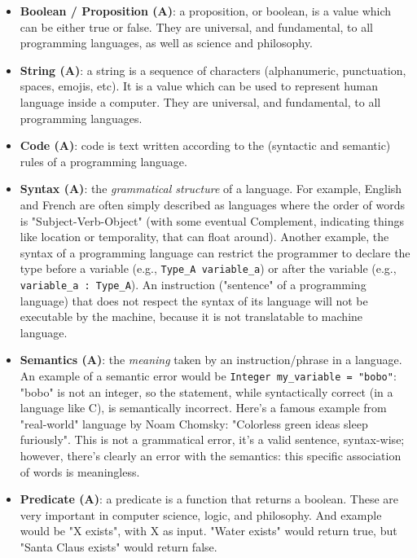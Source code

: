 \documentclass{article}
\begin{document}
\begin{itemize}
	\item \textbf{Boolean / Proposition (A)}: a proposition, or boolean, is a value which can be either true or false. They are universal, and fundamental, to all programming languages, as well as science and philosophy.

	\item \textbf{String (A)}: a string is a sequence of characters (alphanumeric, punctuation, spaces, emojis, etc). It is a value which can be used to represent human language inside a computer. They are universal, and fundamental, to all programming languages.

	\item \textbf{Code (A)}: code is text written according to the (syntactic and semantic) rules of a programming language.

	\item \textbf{Syntax (A)}: the \textit{grammatical structure} of a language. For example, English and French are often simply described as languages where the order of words is "Subject-Verb-Object" (with some eventual Complement, indicating things like location or temporality, that can float around). Another example, the syntax of a programming language can restrict the programmer to declare the type before a variable (e.g., \texttt{Type\_A variable\_a}) or after the variable (e.g., \texttt{variable\_a : Type\_A}). An instruction ("sentence" of a programming language) that does not respect the syntax of its language will not be executable by the machine, because it is not translatable to machine language.

	\item \textbf{Semantics (A)}: the \textit{meaning} taken by an instruction/phrase in a language. An example of a semantic error would be \texttt{Integer my\_variable = "bobo"}: "bobo" is not an integer, so the statement, while syntactically correct (in a language like C), is semantically incorrect. Here's a famous example from "real-world" language by Noam Chomsky: "Colorless green ideas sleep furiously". This is not a grammatical error, it's a valid sentence, syntax-wise; however, there's clearly an error with the semantics: this specific association of words is meaningless.

	\item \textbf{Predicate (A)}: a predicate is a function that returns a boolean. These are very important in computer science, logic, and philosophy. And example would be "X exists", with X as input. "Water exists" would return true, but "Santa Claus exists" would return false.


\end{itemize}
\end{document}
